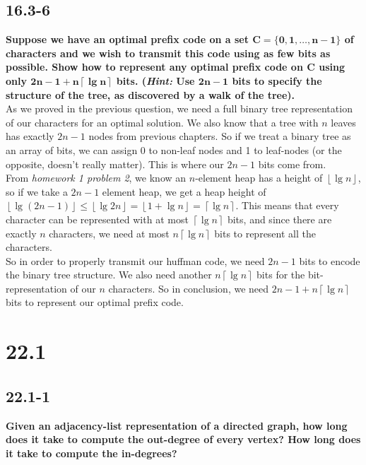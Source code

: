 \documentclass[11pt]{article}
\def\lc{\left\lceil}
\def\rc{\right\rceil}
\def\lf{\left\lfloor}
\def\rf{\right\rfloor}
\begin{document}
 \newpage

 \subsection*{16.3-6}
 \textbf{Suppose we have an optimal prefix code on a set \(\mathbf{C = \{0,1,\dots,n-1\}}\) of 
 characters and we wish to transmit this code using as few bits as possible. Show how to 
 represent any optimal prefix code on \(\mathbf C\) using only \(\mathbf{2n-1 + n\lc \lg n \rc}\) 
 bits. (\textit{Hint:} Use \(\mathbf{2n-1}\) bits to specify the structure of the tree, as 
 discovered by a walk of the tree).} \\ 

 As we proved in the previous question, we need a full binary tree representation of our characters 
 for an optimal solution.  We also know that a tree with \(n\) leaves has exactly \(2n-1\) nodes 
 from previous chapters.  So if we treat a binary tree as an array of bits, we can assign 0 to 
 non-leaf nodes and 1 to leaf-nodes (or the opposite, doesn't really matter).  This is where our 
 \(2n-1\) bits come from. \\

 From \textit{homework 1 problem 2}, we know an $n$-element heap has a height of \(\lf \lg n \rf\), 
 so if we take a $2n-1$ element heap, we get a heap height of \(\lf \lg (2n-1) \rf \leq 
 \lf \lg 2n \rf = \lf 1 + \lg n \rf = \lc \lg n \rc\).  This means that every character can be 
 represented with at most \(\lc \lg n \rc\) bits, and since there are exactly $n$ characters, we 
 need at most \(n\lc \lg n \rc\) bits to represent all the characters. \\

 So in order to properly transmit our huffman code, we need \(2n-1\) bits to encode the binary tree 
 structure. We also need another \(n\lc \lg n \rc\) bits for the bit-representation of our $n$ 
 characters.  So in conclusion, we need \(2n-1 + n\lc \lg n \rc\) bits to represent our optimal 
 prefix code.

 \newpage

 \section*{22.1}
 \subsection*{22.1-1}
 \textbf{Given an adjacency-list representation of a directed graph, how long does it take to 
 compute the out-degree of every vertex? How long does it take to compute the in-degrees?} \\ 
\end{document}
